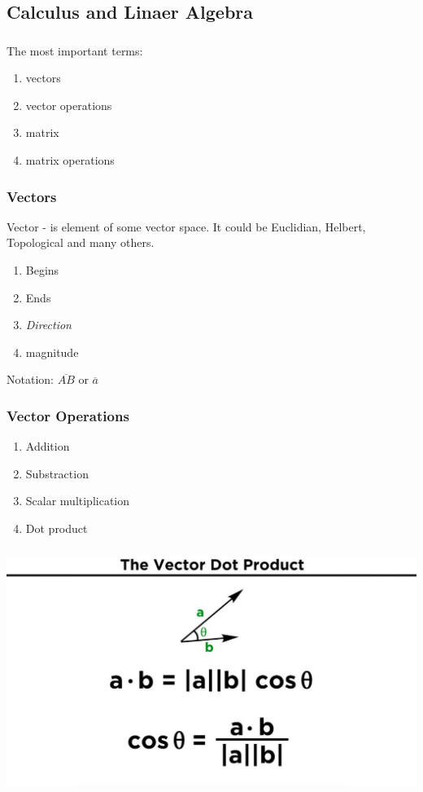\documentclass[t, 11pt]{beamer}
\begin{document}
\subsection{Calculus and Linaer Algebra }
\begin{frame} 
	\frametitle{\insertsection} 
	\frametitle{\insertsubsection} 
	The most important terms:
	\begin{enumerate}
		\item vectors
		\item vector operations
		\item matrix
		\item matrix operations
	\end{enumerate}
\end{frame}

\begin{frame} 
	\frametitle{\insertsection} 
	\frametitle{Vectors} 
	Vector - is element of some vector space. It could be Euclidian, Helbert, Topological and many others.  
	\begin{enumerate}
		\item Begins
		\item Ends
		\item \emph{Direction}
		\item magnitude
	\end{enumerate}
\vspace{1cm}
Notation: $\overline{AB}$ or $\overline{a}$
\end{frame}

\begin{frame} 
	\frametitle{\insertsection} 
	\frametitle{Vector Operations} 
	\begin{enumerate}
		\item Addition
		\item Substraction
		\item Scalar multiplication
		\item Dot product 
	\end{enumerate}

\end{frame}
	
\begin{frame} 
	\frametitle{} 
	\frametitle{} 
\includegraphics[scale=0.3]{dotprod}	
\end{frame}	
\end{document}
